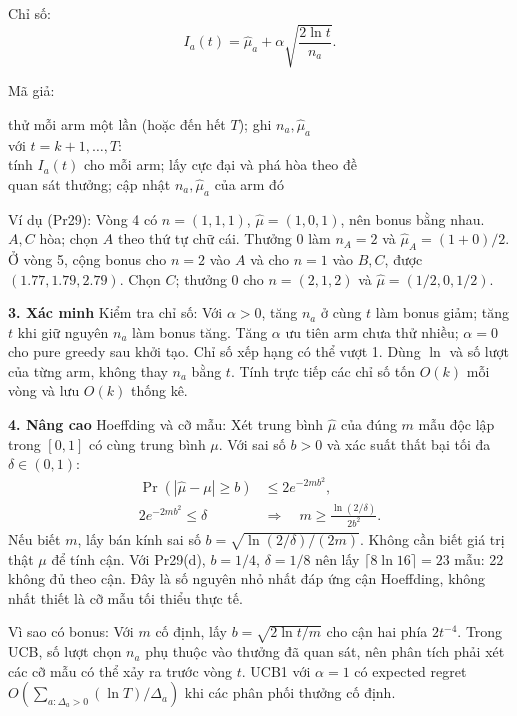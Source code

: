 \documentclass[10pt,a4paper,twocolumn]{article}
\makeatletter
\newcommand{\key}[1]{#1:\enspace}
\newcommand{\unitheading}[2]{%
  \par\addvspace{1pt}\noindent\textbf{#1. #2}\enspace}
\newcommand{\unitverification}{\unitheading{3}{Xác minh}}
\newcommand{\unitadvanced}{\unitheading{4}{Nâng cao}}
\newenvironment{algpseudo}{%
  \par\addvspace{2pt}\noindent
  \setlength{\parskip}{0pt}%
  Mã giả:\par\nobreak
  \begin{list}{}{\setlength{\leftmargin}{1em}\setlength{\topsep}{0pt}%
    \setlength{\partopsep}{0pt}\setlength{\parsep}{0pt}%
    \@beginparpenalty=10000\relax}%
  \item\relax
}{\end{list}\par\addvspace{3pt}}
\makeatother
\begin{document}
\key{Chỉ số}
\[
I_a(t)=\hat\mu_a+\alpha\sqrt{\frac{2\ln t}{n_a}}.
\]

\begin{algpseudo}
thử mỗi arm một lần (hoặc đến hết $T$); ghi $n_a,\hat\mu_a$\\
với $t=k+1,\ldots,T$:\\
\quad tính $I_a(t)$ cho mỗi arm; lấy cực đại và phá hòa theo đề\\
\quad quan sát thưởng; cập nhật $n_a,\hat\mu_a$ của arm đó
\end{algpseudo}

\key{Ví dụ (Pr29)} Vòng 4 có $n=(1,1,1)$, $\hat\mu=(1,0,1)$, nên bonus bằng nhau. $A,C$ hòa; chọn $A$ theo thứ tự chữ cái. Thưởng 0 làm $n_A=2$ và $\hat\mu_A=(1+0)/2$. Ở vòng 5, cộng bonus cho $n=2$ vào $A$ và cho $n=1$ vào $B,C$, được $(1.77,1.79,2.79)$. Chọn $C$; thưởng 0 cho $n=(2,1,2)$ và $\hat\mu=(1/2,0,1/2)$.

\unitverification
\key{Kiểm tra chỉ số} Với $\alpha>0$, tăng $n_a$ ở cùng $t$ làm bonus giảm; tăng $t$ khi giữ nguyên $n_a$ làm bonus tăng. Tăng $\alpha$ ưu tiên arm chưa thử nhiều; $\alpha=0$ cho pure greedy sau khởi tạo. Chỉ số xếp hạng có thể vượt 1. Dùng $\ln$ và số lượt của từng arm, không thay $n_a$ bằng $t$. Tính trực tiếp các chỉ số tốn $O(k)$ mỗi vòng và lưu $O(k)$ thống kê.

\unitadvanced
\key{Hoeffding và cỡ mẫu} Xét trung bình $\hat\mu$ của đúng $m$ mẫu độc lập trong $[0,1]$ có cùng trung bình $\mu$. Với sai số $b>0$ và xác suất thất bại tối đa $\delta\in(0,1)$:
\begin{align*}
\Pr(|\hat\mu-\mu|\ge b)&\le 2e^{-2mb^2},\\
2e^{-2mb^2}\le\delta
\quad&\Rightarrow\quad m\ge\frac{\ln(2/\delta)}{2b^2}.
\end{align*}
Nếu biết $m$, lấy bán kính sai số $b=\sqrt{\ln(2/\delta)/(2m)}$. Không cần biết giá trị thật $\mu$ để tính cận. Với Pr29(d), $b=1/4$, $\delta=1/8$ nên lấy $\lceil8\ln16\rceil=23$ mẫu: 22 không đủ theo cận. Đây là số nguyên nhỏ nhất đáp ứng cận Hoeffding, không nhất thiết là cỡ mẫu tối thiểu thực tế.

\key{Vì sao có bonus} Với $m$ cố định, lấy $b=\sqrt{2\ln t/m}$ cho cận hai phía $2t^{-4}$. Trong UCB, số lượt chọn $n_a$ phụ thuộc vào thưởng đã quan sát, nên phân tích phải xét các cỡ mẫu có thể xảy ra trước vòng $t$. UCB1 với $\alpha=1$ có expected regret $O(\sum_{a:\Delta_a>0}(\ln T)/\Delta_a)$ khi các phân phối thưởng cố định.
\end{document}
